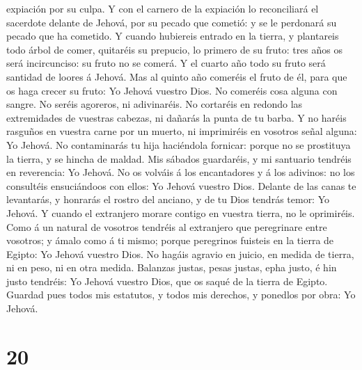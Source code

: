 expiación por su culpa.  Y con el carnero de la expiación
lo reconciliará el sacerdote delante de Jehová, por su pecado que
cometió: y se le perdonará su pecado que ha cometido.  Y
cuando hubiereis entrado en la tierra, y plantareis todo árbol de comer,
quitaréis su prepucio, lo primero de su fruto: tres años os será
incircunciso: su fruto no se comerá.  Y el cuarto año
todo su fruto será santidad de loores á Jehová.  Mas al
quinto año comeréis el fruto de él, para que os haga crecer su fruto: Yo
Jehová vuestro Dios.  No comeréis cosa alguna con sangre.
No seréis agoreros, ni adivinaréis.  No cortaréis en
redondo las extremidades de vuestras cabezas, ni dañarás la punta de tu
barba.  Y no haréis rasguños en vuestra carne por un
muerto, ni imprimiréis en vosotros señal alguna: Yo Jehová.
 No contaminarás tu hija haciéndola fornicar: porque no
se prostituya la tierra, y se hincha de maldad.  Mis
sábados guardaréis, y mi santuario tendréis en reverencia: Yo Jehová.
 No os volváis á los encantadores y á los adivinos: no
los consultéis ensuciándoos con ellos: Yo Jehová vuestro Dios.
 Delante de las canas te levantarás, y honrarás el rostro
del anciano, y de tu Dios tendrás temor: Yo Jehová.  Y
cuando el extranjero morare contigo en vuestra tierra, no le oprimiréis.
 Como á un natural de vosotros tendréis al extranjero que
peregrinare entre vosotros; y ámalo como á ti mismo; porque peregrinos
fuisteis en la tierra de Egipto: Yo Jehová vuestro Dios. 
No hagáis agravio en juicio, en medida de tierra, ni en peso, ni en otra
medida.  Balanzas justas, pesas justas, epha justo, é hin
justo tendréis: Yo Jehová vuestro Dios, que os saqué de la tierra de
Egipto.  Guardad pues todos mis estatutos, y todos mis
derechos, y ponedlos por obra: Yo Jehová.

\hypertarget{section-19}{%
\section{20}\label{section-19}}

